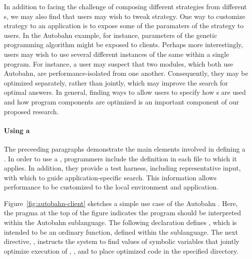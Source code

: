 In addition to facing the challenge of composing different strategies from different \rasp{}s,
we may also find that users may wish to tweak \rasp{} strategy.  One way to customize \rasp{}
strategy to an application is to expose some of the paramaters of the \rasp{} strategy to users.
In the Autobahn example, for instance, parameters of the genetic programming algorithm might
be exposed to clients.  Perhaps more interestingly, users may wish to use several different
instances of the same \rasp{} within a single program.  For instance, a user may suspect that
two modules, which both use Autobahn, are performance-isolated from one another.  Consequently,
they may be optimized separately, rather than jointly, which may improve the search for
optimal answers.  In general, finding ways to allow users to specify how \rasp{}s are used and how program
components are optimized is an important component of our proposed research.

\paragraph*{Using a \rasp{}}

The preceeding paragraphs demonstrate the main elements involved in
defining a \rasp.  In order to use a \rasp, programmers include the
\rasp{} definition in each file to which it applies.  In addition,
they provide a test harness, including representative input, with
which to guide application-specific search.  This information allows
performance to be customized to the local environment and application.

Figure~\ref{fig:autobahn-client} sketches a simple use case of the Autobahn \rasp.
Here, the pragma at the top of the figure indicates the program should be interpreted
within the Autobahn sublanguage.  The following declaration defines ,
which is intended to be an ordinary function, defined within the \rasp{} sublanguage.
The next directive, , instructs the system to find values of symbolic
variables that jointly optimize execution of , , \etc{}
and to place optimized code in the specified directory.

